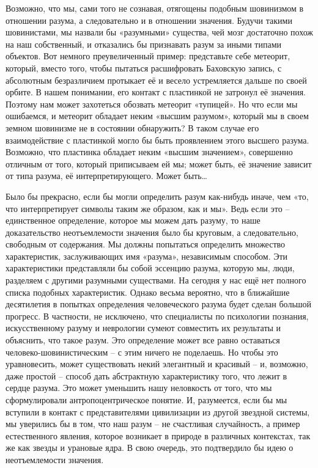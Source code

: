 \documentclass[../main.tex]{subfiles}
\begin{document}
Возможно, что мы, сами того не сознавая, отягощены подобным шовинизмом в отношении разума, а следовательно и в отношении значения. Будучи такими шовинистами, мы назвали бы «разумными» существа, чей мозг достаточно похож на наш собственный, и отказались бы признавать разум за иными типами объектов. Вот немного преувеличенный пример: представьте себе метеорит, который, вместо того, чтобы пытаться расшифровать Баховскую запись, с абсолютным безразличием протыкает её и весело устремляется дальше по своей орбите. В нашем понимании, его контакт с пластинкой не затронул её значения. Поэтому нам может захотеться обозвать метеорит «тупицей». Но что если мы ошибаемся, и метеорит обладает неким «высшим разумом», который мы в своем земном шовинизме не в состоянии обнаружить? В таком случае его взаимодействие с пластинкой могло бы быть проявлением этого высшего разума. Возможно, что пластинка обладает неким «высшим значением», совершенно отличным от того, который приписываем ей мы; может быть, её значение зависит от типа разума, её интерпретирующего. Может быть\ldots{}

Было бы прекрасно, если бы могли определить разум как-нибудь иначе, чем «то, что интерпретирует символы таким же образом, как и мы». Ведь если это \--- единственное определение, которое мы можем дать разуму, то наше доказательство неотъемлемости значения было бы круговым, а следовательно, свободным от содержания. Мы должны попытаться определить множество характеристик, заслуживающих имя «разума», независимым способом. Эти характеристики представляли бы собой эссенцию разума, которую мы, люди, разделяем с другими разумными существами. На сегодня у нас ещё нет полного списка подобных характеристик. Однако весьма вероятно, что в ближайшие десятилетия в попытках определения человеческого разума будет сделан большой прогресс. В частности, не исключено, что специалисты по психологии познания, искусственному разуму и неврологии сумеют совместить их результаты и объяснить, что такое разум. Это определение может все равно оставаться человеко-шовинистическим \--- с этим ничего не поделаешь. Но чтобы это уравновесить, может существовать некий элегантный и красивый \--- и, возможно, даже простой \--- способ дать абстрактную характеристику того, что лежит в сердце разума. Это может уменьшить нашу неловкость от того, что мы сформулировали антропоцентрическое понятие. И, разумеется, если бы мы вступили в контакт с представителями цивилизации из другой звездной системы, мы уверились бы в том, что наш разум \--- не счастливая случайность, а пример естественного явления, которое возникает в природе в различных контекстах, так же как звезды и урановые ядра. В свою очередь, это подтвердило бы идею о неотъемлемости значения.
\end{document}
